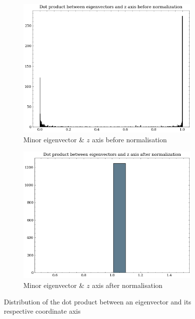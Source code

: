 \begin{figure}[H]
\vspace{1cm}
    \begin{subfigure}[b]{0.45\textwidth}
        \centering
        \includegraphics[width=\textwidth]{assets/preprocessing/Dot_product_between_eigenvectors_and_z_axis_before_normalization.png}
        \caption{Minor eigenvector \& $z$ axis before normalisation}
        \label{fig:resampling-alignment-z-before}
    \end{subfigure}
    \hfill
    \begin{subfigure}[b]{0.45\textwidth}
        \centering
        \includegraphics[width=\textwidth]{assets/preprocessing/Dot_product_between_eigenvectors_and_z_axis_after_normalization.png}
        \caption{Minor eigenvector \& $z$ axis after normalisation}
        \label{fig:resampling-alignment-z-after}
    \end{subfigure}
    \caption{Distribution of the dot product between an eigenvector and its respective coordinate axis}
    \label{fig:resampling-alignment}
\end{figure}


